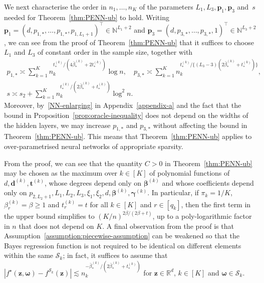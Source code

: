 \documentclass[12pt]{article}
\begin{document}
We next characterise the order in $n_1,\ldots,n_K$ of the parameters $L_1,L_3,\bm p_1, \bm p_3$ and~$s$ needed for Theorem~\ref{thm:PENN-ub} to hold.  Writing $\bm p_1 = (d, p_{1,*}, \ldots, p_{1,*}, p_{1,L_1+1})^\top \in \mathbb{N}^{L_1+2}$ and $\bm p_3 = (d, p_{3,*}, \ldots, p_{3,*}, 1)^\top \in \mathbb{N}^{L_3+2}$, we can see from the proof of Theorem~\ref{thm:PENN-ub} that it suffices to choose $L_1$ and $L_3$ of constant order in the sample size, together with 
\begin{gather*}
    p_{1,*} \asymp \sum_{k=1}^K n_k^{t^{(k)}_* / (4\bar{\beta}^{(k)}_* + 2t^{(k)}_*)}\log n, \quad
    p_{3,*} \asymp \sum_{k=1}^K n_k^{t^{(k)}_* / \{(L_3-3)(2\bar{\beta}^{(k)}_* + t^{(k)}_*)\}}, \\
    s \asymp s_2 + \sum_{k=1}^K n_k^{t^{(k)}_* / (2\bar{\beta}^{(k)}_* + t^{(k)}_*)}\log^2 n. 
\end{gather*}
Moreover, by~\ref{NN-enlarging} in Appendix~\ref{appendix-a} and the fact that the bound in Proposition~\ref{prop:oracle-inequality} does not depend on the widths of the hidden layers, we may increase $p_{1,*}$ and $p_{3,*}$ without affecting the bound in Theorem~\ref{thm:PENN-ub}.  This means that Theorem~\ref{thm:PENN-ub} applies to over-parametrised neural networks of appropriate sparsity. 

From the proof, we can see that the quantity $C > 0$ in Theorem~\ref{thm:PENN-ub} may be chosen as the maximum over $k\in[K]$ of polynomial functions of $d, \bm d^{(k)}, \bm t^{(k)}$, whose degrees depend only on $\bm\beta^{(k)}$ and whose coefficients depend only on $p_{2,L_2+1}, L_1, L_2, L_3, \xi_1, \xi_2, d, \bm\beta^{(k)}, \bm\gamma^{(k)}$.  In particular, if $\pi_k = 1/K$, $\beta^{(k)}_r = \beta \geq 1$ and $t^{(k)}_r = t$ for all $k\in[K]$ and $r\in[q_k]$, then the first term in the upper bound simplifies to $(K/n)^{2\beta/(2\beta+t)}$, up to a poly-logarithmic factor in $n$ that does not depend on $K$.   A final observation from the proof is that Assumption~\ref{assumption:piecewise-assumption} can be weakened so that the Bayes regression function is not required to be identical on different elements within the same $\mathcal{S}_k$; in fact, it suffices to assume that $|f^{\star}(\bm z,\bm\omega) - f^{\mathcal{S}_k}(\bm z)| \lesssim n_k^{-\bar{\beta}_*^{(k)} / (2\bar{\beta}_*^{(k)} + t_*^{(k)})}$ for $\bm z\in\mathbb{R}^d$, $k\in[K]$ and $\bm\omega \in \mathcal{S}_k$.

\end{document}

